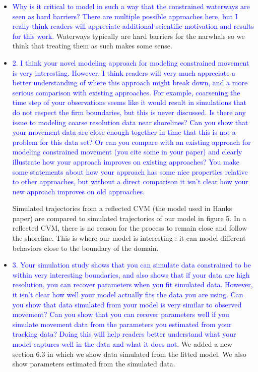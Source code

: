 \documentclass{amsart}
\theoremstyle{plain}
\theoremstyle{remark}
\newcommand {\1}{\mathbb{1}}
\begin{document}
\begin{itemize}
    \item \textcolor{blue}{ Why is it critical to model in such a way that the constrained waterways are seen as hard barriers?  There are multiple possible approaches here, but I really think readers will appreciate additional scientific motivation and results for this work.}
    Waterways typically are hard barriers for the narwhals so we think that treating them as such makes some sense.

    \item \textcolor{blue}{ 2.	I think your novel modeling approach for modeling constrained movement is very interesting.  However, I think readers will very much appreciate a better understanding of where this approach might break down, and a more serious comparison with existing approaches.  For example, coarsening the time step of your observations seems like it would result in simulations that do not respect the firm boundaries, but this is never discussed.  Is there any issue to modeling coarse resolution data near shorelines?  Can you show that your movement data are close enough together in time that this is not a problem for this data set?  Or can you compare with an existing approach for modeling constrained movement (you cite some in your paper) and clearly illustrate how your approach improves on existing approaches?  You make some statements about how your approach has some nice properties relative to other approaches, but without a direct comparison it isn’t clear how your new approach improves on old approaches. }

    Simulated trajectories from a reflected CVM (the model used in Hanks paper) are compared to simulated trajectories of our model in figure 5. In a reflected CVM, there is no reason for the process to remain close and follow the shoreline. This is where our model is interesting : it can model different behaviors close to the boundary of the domain.

    \item \textcolor{blue}{ 3.	Your simulation study shows that you can simulate data constrained to be within very interesting boundaries, and also shows that if your data are high resolution, you can recover parameters when you fit simulated data.  However, it isn’t clear how well your model actually fits the data you are using.  Can you show that data simulated from your model is very similar to observed movement?  Can you show that you can recover parameters well if you simulate movement data from the parameters you estimated from your tracking data?  Doing this will help readers better understand what your model captures well in the data and what it does not.}
    We added a new section 6.3 in which we show data simulated from the fitted model. We also show parameters estimated from the simulated data.
    

\end{itemize}
\end{document}

